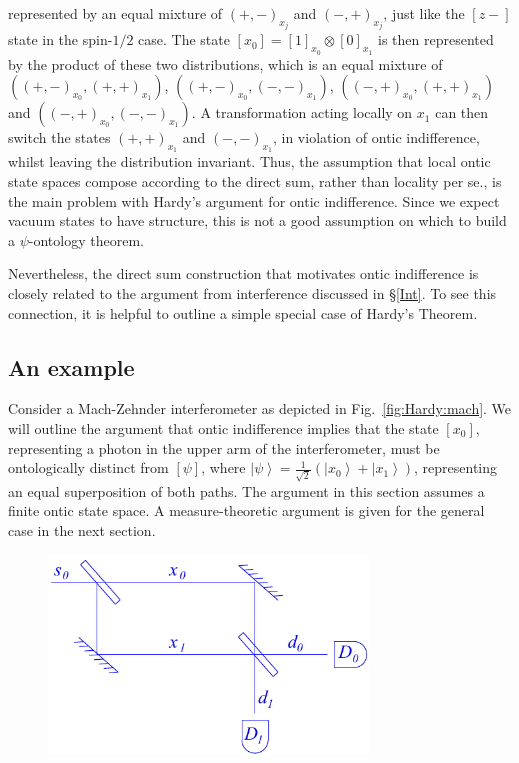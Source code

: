 \documentclass[DIV=calc,paper=a4,fontsize=11pt,twocolumn]{scrartcl} %
\theoremstyle{definition}
\theoremstyle{plain}
\newcommand{\Ket}[1]{\ensuremath{\left \vert #1 \right \rangle}}
\newcommand{\Proj}[1]{\ensuremath{\left [ #1 \right ]}}
\begin{document}
represented by an equal mixture of $(+,-)_{x_j}$ and $(-,+)_{x_j}$,
just like the $\Proj{z-}$ state in the spin-$1/2$ case.  The state
$\Proj{x_0} = \Proj{1}_{x_0} \otimes \Proj{0}_{x_1}$ is then
represented by the product of these two distributions, which is an
equal mixture of $((+,-)_{x_0},(+,+)_{x_1})$,
$((+,-)_{x_0},(-,-)_{x_1})$, $((-,+)_{x_0},(+,+)_{x_1})$ and
$((-,+)_{x_0},(-,-)_{x_1})$.  A transformation acting locally on $x_1$
can then switch the states $(+,+)_{x_1}$ and $(-,-)_{x_1}$, in
violation of ontic indifference, whilst leaving the distribution
invariant.  Thus, the assumption that local ontic state spaces compose
according to the direct sum, rather than locality per se., is the main
problem with Hardy's argument for ontic indifference.  Since we expect
vacuum states to have structure, this is not a good assumption on
which to build a $\psi$-ontology theorem.

Nevertheless, the direct sum construction that motivates ontic
indifference is closely related to the argument from interference
discussed in \S\ref{Int}.  To see this connection, it is helpful to
outline a simple special case of Hardy's Theorem.

\subsection{An example}

\label{HExa}

Consider a Mach-Zehnder interferometer as depicted in
Fig.~\ref{fig:Hardy:mach}.  We will outline the argument that ontic
indifference implies that the state $\Proj{x_0}$, representing a
photon in the upper arm of the interferometer, must be ontologically
distinct from $\Proj{\psi}$, where $\Ket{\psi} = \frac{1}{\sqrt{2}}
\left ( \Ket{x_0} + \Ket{x_1} \right )$, representing an equal
superposition of both paths.  The argument in this section assumes a
finite ontic state space.  A measure-theoretic argument is given for
the general case in the next section.

\begin{figure}[t!]
\centering
\includegraphics[width=85mm]{Fig13.pdf}
\caption{}
\end{figure}
\end{document}
